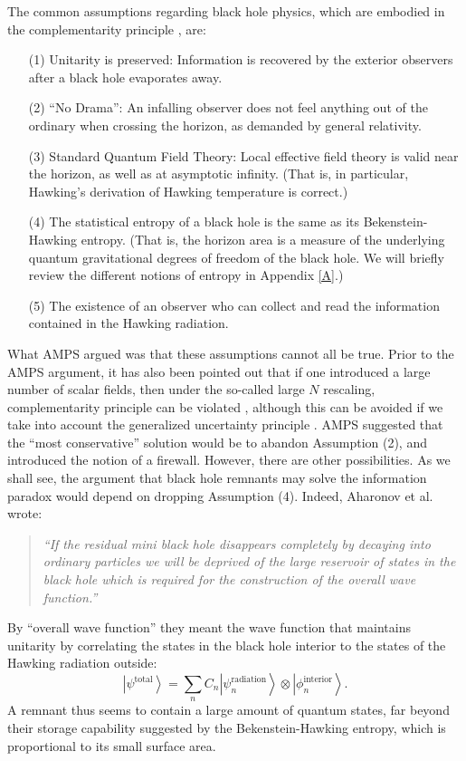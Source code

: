 \documentclass[12pt]{article}
\newcommand{\2}{$^2$}
\newcommand{\3}{$^3$}
\newcommand{\4}{$_4$}
\newcommand{\5}{$_5$}
\begin{document}
The common assumptions regarding black hole physics, which are embodied in the complementarity principle \cite{kn:stu}, are:
\begin{itemize}
\item[(1)] Unitarity is preserved: Information is recovered by the exterior observers after a black hole evaporates away.
\item[(2)] ``No Drama'': An infalling observer does not feel anything out of the ordinary when crossing the horizon, as demanded by general relativity.
\item[(3)] Standard Quantum Field Theory: Local effective field theory is valid near the horizon, as well as at asymptotic infinity. (That is, in particular, Hawking's derivation of Hawking temperature is correct.)
\item[(4)] The statistical entropy of a black hole is the same as its Bekenstein-Hawking entropy. (That is, the horizon area is a measure of the underlying quantum gravitational degrees of freedom of the black hole. We will briefly review the different notions of entropy in Appendix \ref{A}.) 
\item[(5)] The existence of an observer who can collect and read the information contained in the Hawking radiation.
 \end{itemize}
What AMPS argued was that these assumptions cannot all be true. Prior to the AMPS argument, it has also been pointed out that if one introduced a large number of scalar fields, then under the so-called large $N$ rescaling, complementarity principle can be violated \cite{Yeom:2008qw1,Yeom:2008qw0}, although this can be avoided if we take into account the generalized uncertainty principle \cite{COY}. AMPS suggested that the ``most conservative'' solution would be to abandon Assumption (2), and introduced the notion of a firewall. However, there are other possibilities. As we shall see, the argument that black hole remnants may solve the information paradox would depend on dropping Assumption (4). Indeed, Aharonov et al. \cite{ACN} wrote:
\begin{quote}
\emph{``If the residual mini black hole disappears completely by decaying into ordinary particles we will be deprived of the large reservoir of states in the black hole which is required for the construction of the overall wave function.''}
\end{quote}
By ``overall wave function'' they meant the wave function that maintains unitarity by correlating the states in the black hole interior to the states of the Hawking radiation outside:
\begin{equation}
\left|\psi^{\text{total}} \right\rangle = \sum_n C_n \left|\psi_n^{\text{radiation}} \right\rangle  \otimes \left|\phi_n^{\text{interior}}\right\rangle.
\end{equation}
A remnant thus seems to contain a large amount of quantum states, far beyond their storage capability suggested by the Bekenstein-Hawking entropy, which is proportional to its small surface area.
\end{document}
